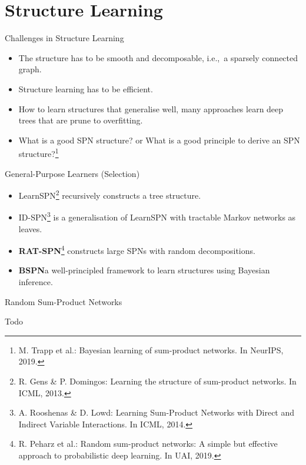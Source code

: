 \section{Structure Learning}

\begin{frame}{Challenges in Structure Learning}
\begin{itemize}
    \item The structure has to be smooth and decomposable, i.e.,~a sparsely connected graph.
    \item Structure learning has to be efficient.
    \item How to learn structures that generalise well, many approaches learn deep trees that are prune to overfitting.
    \item What is a good SPN structure? or What is a good principle to derive an SPN structure?\footnote{\scriptsize M. Trapp et al.: Bayesian learning of sum-product networks. In NeurIPS, 2019.\label{fn:bspn}}
\end{itemize}
\end{frame}


\begin{frame}{General-Purpose Learners (Selection)}{}
\begin{itemize}
    \item LearnSPN\footnote{\scriptsize R. Gens \& P. Domingos: Learning the structure of sum-product networks. In ICML, 2013.} recursively constructs a tree structure.
    \item ID-SPN\footnote{\scriptsize A. Rooshenas \& D. Lowd: Learning Sum-Product Networks with Direct and Indirect Variable Interactions. In ICML, 2014.} is a generalisation of LearnSPN with tractable Markov networks as leaves.
    \item \textbf{RAT-SPN}\footnote{\scriptsize R. Peharz et al.: Random sum-product networks: A simple but effective approach to probabilistic deep learning. In UAI, 2019.} constructs large SPNs with random decompositions.
    \item \textbf{BSPN}\footnotemark[8] a well-principled framework to learn structures using Bayesian inference.
\end{itemize}
\end{frame}


\begin{frame}{Random Sum-Product Networks}{}

    Todo

\end{frame}

